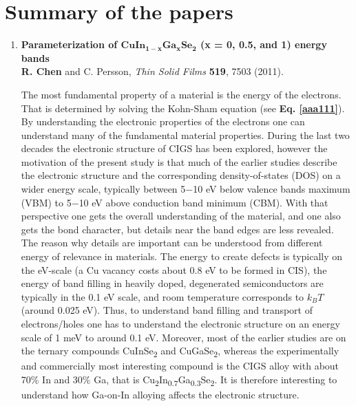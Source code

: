 \documentclass[a4paper, 12pt, titlepage,oneside,drop]{kthesis}
\begin{document}
\section{Summary of the papers}
\begin{enumerate}
\renewcommand{\labelenumi}{\Roman{enumi}}
\item{}  \textbf{Parameterization of $\mathbf {CuIn_{1-x}Ga_{x}Se_2}$ (x = 0, 0.5, and 1) energy bands}
\\\textbf{R. Chen} and C. Persson, \textit{Thin Solid Films} {\textbf {519}}, 7503 (2011).

\noindent 

The most fundamental property of a material is the energy of the electrons. That is determined by solving the Kohn-Sham equation (see \textbf{Eq. \ref{aaa111}}). By understanding the electronic properties of the electrons one 
can understand many of the fundamental material properties. During the last two decades the electronic structure of CIGS has been explored, however the motivation of the present study is that much of the earlier studies describe 
the electronic structure and the corresponding density-of-states (DOS) on a wider energy scale, typically between 5$-$10 eV below valence bands maximum (VBM) to 5$-$10 eV above conduction band minimum (CBM). With that perspective one
gets the overall understanding of the material, and one also gets the bond character, but details near the band edges are less revealed. The reason why details are important can be understood from different energy of relevance in
materials. The energy to create defects is typically on the eV-scale (a Cu vacancy costs about 0.8 eV to be formed in CIS), the energy of band filling in heavily doped, degenerated semiconductors are typically in the 0.1 eV scale, and
room temperature corresponds to $k_BT $ (around 0.025 eV). Thus, to understand band filling and transport of electrons/holes one has to understand the electronic structure on an energy scale of 1 meV to around 0.1 eV. Moreover, most of the
earlier studies are on the ternary compounds CuInSe\textsubscript{2} and CuGaSe\textsubscript{2}, whereas the experimentally and commercially most interesting compound is the CIGS alloy with about 70\% In and 30\% Ga, that is
Cu\textsubscript{2}In\textsubscript{0.7}Ga\textsubscript{0.3}Se\textsubscript{2}. It is therefore interesting to understand how Ga-on-In alloying affects the electronic structure.   


\end{enumerate}
\end{document}
